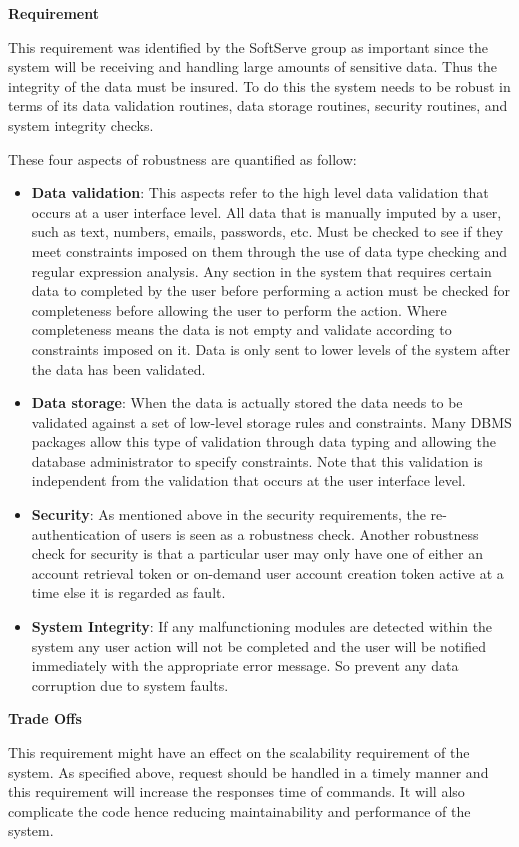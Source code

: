 \begin{flushleft}
\vspace{0.1in}

\textbf{Requirement}

This requirement was identified by the SoftServe group as important since the system will be receiving and handling large amounts of sensitive data. Thus the integrity of the data must be insured. To do this the system needs to be robust in terms of its data validation routines, data storage routines, security routines, and system integrity checks. 

These four aspects of robustness are quantified as follow:
\begin{itemize}
\item \textbf{Data validation}: This aspects refer to the high level data validation that occurs at a user interface level. All data that is manually imputed by a user, such as text, numbers, emails, passwords, etc. Must be checked to see if they meet constraints imposed on them through the use of data type checking and regular expression analysis. Any section in the system that requires certain data to completed by the user before performing a action must be checked for completeness before allowing the user to perform the action. Where completeness means the data is not empty and validate according to constraints imposed on it. Data is only sent to lower levels of the system after the data has been validated.
\item \textbf{Data storage}: When the data is actually stored the data needs to be validated against a set of low-level storage rules and constraints. Many DBMS packages allow this type of validation through data typing and allowing the database administrator to specify constraints. Note that this validation is independent from the validation that occurs at the user interface level.
\item \textbf{Security}: As mentioned above in the security requirements, the re-authentication of users is seen as a robustness check. Another robustness check for security is that a particular user may only have one of either an account retrieval token or on-demand user account creation token active at a time else it is regarded as fault.
\item \textbf{System Integrity}: If any malfunctioning modules are detected within the system any user action will not be completed and the user will be notified immediately with the appropriate error message. So prevent any data corruption due to system faults.
\end{itemize}
\vspace{0.1in}

\textbf{Trade Offs}

This requirement might have an effect on the scalability requirement of the system. As specified above, request should be handled in a timely manner and this requirement will increase the responses time of commands. It will also complicate the code hence reducing maintainability and performance of the system.
\vspace{0.1in}
\end{flushleft}
\newpage
